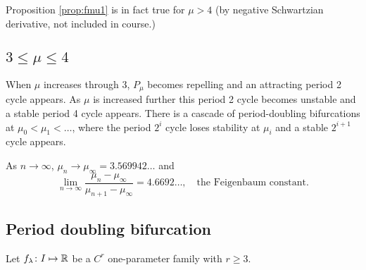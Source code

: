 \documentclass{notes}
\theoremstyle{plain}
\begin{document}
Proposition \ref{prop:fmu1} is in fact true for $\mu > 4$
(by negative Schwartzian derivative, not included in course.)

\subsection{$3 \le \mu \le 4$}

When $\mu$ increases through 3, $P_\mu$ becomes repelling and an
attracting period 2 cycle appears.  As $\mu$ is increased further
this period 2 cycle becomes unstable and a stable period 4 cycle appears.
There is a cascade of period-doubling bifurcations at
$\mu_0 < \mu_1 < \dots$, where the period $2^i$ cycle loses stability
at $\mu_i$ and a stable $2^{i+1}$ cycle appears.

As $n \to \infty$, $\mu_n \to \mu_\infty = 3.569942\dots$ and
\[
\lim_{n \to \infty} \frac{\mu_n - \mu_\infty}{\mu_{n+1} - \mu_\infty}
= 4.6692\dots, \quad \text{the Feigenbaum constant.}
\]

\subsection{Period doubling bifurcation}

\vspace{1.5in}

Let $f_\lambda \colon I \mapsto \mathbb{R}$ be a $C^r$ one-parameter
family with $r \ge 3$.
\end{document}
